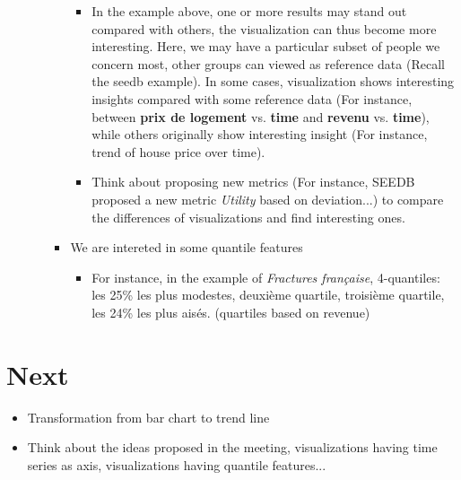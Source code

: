 \documentclass{article}
\begin{document}
\begin{itemize}
\begin{itemize}
\begin{itemize}
\begin{itemize}
				\item In the example above, one or more results may stand out compared with others, the visualization can thus become more interesting. Here, we may have a particular subset of people we concern most, other groups can viewed as reference data (Recall the seedb example). In some cases, visualization shows interesting insights compared with some reference data (For instance, between {\bf prix de logement} vs. {\bf time} and {\bf revenu} vs. {\bf time}), while others originally show interesting insight (For instance, trend of house price over time).
				\item Think about proposing new metrics (For instance, SEEDB proposed a new metric {\em Utility} based on deviation...) to compare the differences of visualizations and find interesting ones.
			\end{itemize}
			\item We are intereted in some quantile features
			\begin{itemize}
				\item For instance, in the example of {\em Fractures française}, 4-quantiles: les 25\% les plus modestes, deuxième quartile, troisième quartile, les 24\% les plus aisés. (quartiles based on revenue)
			\end{itemize}
		\end{itemize}
	\end{itemize}
\end{itemize}

\section{Next}
\begin{itemize}
	\item Transformation from bar chart to trend line
	\item Think about the ideas proposed in the meeting, visualizations having time series as axis, visualizations having quantile features...
\end{itemize}
\end{document}

